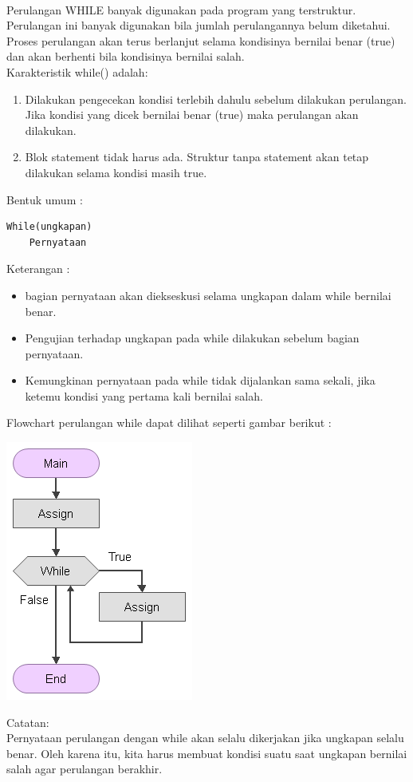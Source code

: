 \documentclass[a4paper,12pt]{article}
\begin{document}
\paragraph{}
Perulangan WHILE banyak digunakan pada program yang terstruktur. Perulangan
ini banyak digunakan bila jumlah perulangannya belum diketahui. Proses perulangan
akan terus berlanjut selama kondisinya bernilai benar (true) dan akan berhenti bila
kondisinya bernilai salah.\\
Karakteristik while() adalah:
\begin{enumerate}
	\item Dilakukan pengecekan kondisi terlebih dahulu sebelum dilakukan perulangan. Jika kondisi yang dicek bernilai benar (true) maka perulangan akan dilakukan.
	\item Blok statement tidak harus ada. Struktur tanpa statement akan tetap dilakukan
	selama kondisi masih true.
\end{enumerate}
Bentuk umum :\\

\begin{lstlisting}[frame=single, linewidth=5cm]
While(ungkapan)
	Pernyataan
\end{lstlisting} 

Keterangan :
\begin{itemize}
	\item bagian pernyataan akan diekseskusi selama ungkapan dalam while bernilai benar.
	\item Pengujian terhadap ungkapan pada while dilakukan sebelum bagian pernyataan.
	\item Kemungkinan pernyataan pada while tidak dijalankan sama sekali, jika ketemu
	kondisi yang pertama kali bernilai salah.
\end{itemize}
\newpage
Flowchart perulangan while dapat dilihat seperti gambar berikut :\\
\begin{center}
	\includegraphics[scale=.5]{image--022}
\end{center}
Catatan:\\
Pernyataan perulangan dengan while akan selalu dikerjakan jika ungkapan selalu benar.
Oleh karena itu, kita harus membuat kondisi suatu saat ungkapan bernilai salah agar
perulangan berakhir.
\end{document}
